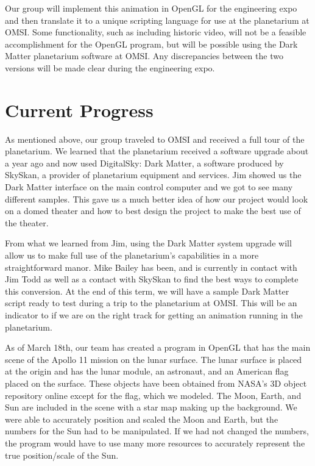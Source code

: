 \documentclass[onecolumn, draftclsnofoot,10pt, compsoc]{IEEEtran}
\begin{document}
Our group will implement this animation in OpenGL for the engineering expo and then translate it to a unique scripting language for use at the planetarium at OMSI. Some functionality, such as including historic video, will not be a feasible accomplishment for the OpenGL program, but will be possible using the Dark Matter planetarium software at OMSI. Any discrepancies between the two versions will be made clear during the engineering expo. 

\section{Current Progress}

As mentioned above, our group traveled to OMSI and received a full tour of the planetarium. We learned that the planetarium received a software upgrade about a year ago and now used DigitalSky: Dark Matter, a software produced by SkySkan, a provider of planetarium equipment and services. Jim showed us the Dark Matter interface on the main control computer and we got to see many different samples. This gave us a much better idea of how our project would look on a domed theater and how to best design the project to make the best use of the theater.

From what we learned from Jim, using the Dark Matter system upgrade will allow us to make full use of the planetarium's capabilities in a more straightforward manor. Mike Bailey has been, and is currently in contact with Jim Todd as well as a contact with SkySkan to find the best ways to complete this conversion. At the end of this term, we will have a sample Dark Matter script ready to test during a trip to the planetarium at OMSI. This will be an indicator to if we are on the right track for getting an animation running in the planetarium. 

As of March 18th, our team has created a program in OpenGL that has the main scene of the Apollo 11 mission on the lunar surface. The lunar surface is placed at the origin and has the lunar module, an astronaut, and an American flag placed on the surface. These objects have been obtained from NASA's 3D object repository online except for the flag, which we modeled. The Moon, Earth, and Sun are included in the scene with a star map making up the background. We were able to accurately position and scaled the Moon and Earth, but the numbers for the Sun had to be manipulated. If we had not changed the numbers, the program would have to use many more resources to accurately represent the true position/scale of the Sun. 
\end{document}
